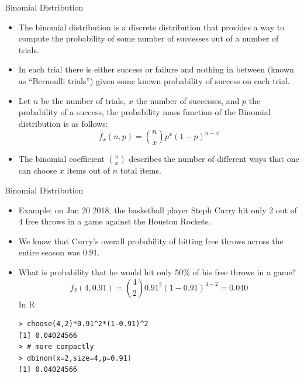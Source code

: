 \documentclass[handout]{beamer}
\begin{document}
\begin{frame}[fragile]{Binomial Distribution}

\scriptsize{
\begin{itemize}
 \item  The binomial distribution is a discrete distribution that provides a way to compute the probability of some number of successes out of a number of trials.
 \item In each trial there is either success or failure and nothing in between (known as “Bernoulli trials”) given some known probability of success on each trial.
 \item Let $n$ be the number of trials, $x$ the number of successes, and $p$ the probability of a success, the probability mass function of the Binomial distribution is as follows:
 \begin{displaymath}
  f_x(n,p)= {n \choose x}p^{x}(1-p)^{n-x} 
 \end{displaymath}
\item The binomial coefficient ${n \choose x}$ describes the number of different ways that one can choose $x$ items out of $n$ total items.

 \end{itemize}}
 
 \end{frame}
 
 
\begin{frame}[fragile]{Binomial Distribution}

\scriptsize{
\begin{itemize}
\item Example: on Jan 20 2018, the basketball player Steph Curry hit only 2 out of 4 free throws in a game against the Houston Rockets.
\item We know that Curry's overall probability of hitting free throws across the entire season was 0.91.
\item What is probability that he would hit only 50\% of his free throws in a game?
\begin{displaymath}
 f_2(4,0.91) = {4 \choose 2}0.91^{2}(1-0.91)^{4-2}=0.040 
\end{displaymath}
In R: 
\begin{verbatim}
> choose(4,2)*0.91^2*(1-0.91)^2
[1] 0.04024566
> # more compactly
> dbinom(x=2,size=4,p=0.91)
[1] 0.04024566
\end{verbatim}
 
 \end{itemize}}
 
 \end{frame}
\end{document}
